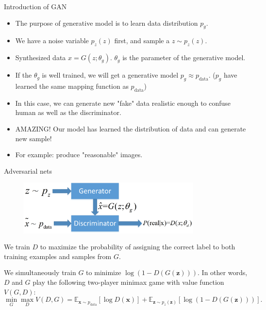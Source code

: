 \documentclass[10pt]{beamer}
\begin{document}
	\begin{frame}{Introduction of GAN}
		\begin{itemize}
			\item The purpose of generative model is to learn data distribution $p_g$.
			\item We have a noise variable $p_z(z)$ first, and sample a $z\sim p_z(z)$.
			\item Synthesized data $\hat{x}=G(z;\theta_g)$. $\theta_g$ is the parameter of the generative model.
			\item If the $\theta_g$ is well trained, we will get a generative model $p_g\approx p_{\text{data}}$. ($p_g$ have learned the same mapping function as $p_{\text{data}}$)
			\item In this case, we can generate new "fake" data realistic enough to confuse human as well as the discriminator.
			\item AMAZING! Our model has learned the distribution of data and can generate new sample!
			\item For example: produce "reasonable" images.
		\end{itemize}
	\end{frame}

	\begin{frame}{Adversarial nets}
		\begin{figure}
			\includegraphics[width=25em]{figures/GAN-general-structure.png}
		\end{figure}
		We train $D$ to maximize the probability of assigning the correct label to both training examples and samples from $G$.
	
		We simultaneously train $G$ to minimize $\log(1-D(G(\bm{z})))$. In other words, $D$ and $G$ play the following two-player minimax game with value function $V(G,D)$:
		$$
		\mathop{\min}_{G}\mathop{\max}_{D}V(D,G)=\mathbb{E}_{\bm{x}\sim p_{\text{data}}}\left[\log D(\bm{x})\right]+\mathbb{E}_{\bm{z}\sim p_z(\bm{z})}\left[\log(1-D(G(\bm{z})))\right].
		$$
		
	\end{frame}
\end{document}
